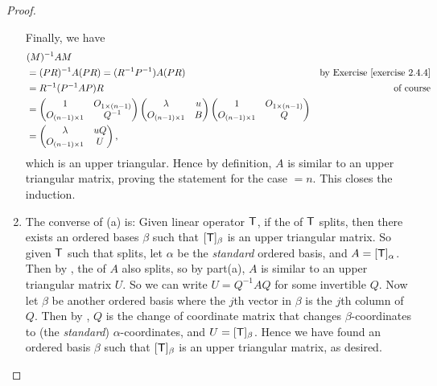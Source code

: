 \begin{proof}
\begin{enumerate}
Finally, we have
\begin{align*}
    & (M)^{-1} A M \\
    & = (PR)^{-1} A (PR) = (R^{-1} P^{-1}) A (P R) & \text{by \EXEC{2.4.4}} \\
    & = R^{-1} (P^{-1} A P) R & \text{of course} \\
    & = \begin{pmatrix}
        1 & O_{1 \X (n - 1)} \\
        O_{(n - 1) \X 1} & Q^{-1}
    \end{pmatrix}
    \begin{pmatrix}
        \lambda & u \\
        O_{(n - 1) \X 1} & B
    \end{pmatrix} \begin{pmatrix}
        1 & O_{1 \X (n - 1)} \\
        O_{(n - 1) \X 1} & Q
    \end{pmatrix} \\
    & = \begin{pmatrix}
        \lambda & uQ \\
        O_{(n - 1) \X 1} & U
    \end{pmatrix},
\end{align*}
which is an upper triangular.
Hence by definition, \(A\) is similar to an upper triangular matrix, proving the statement for the case \(= n\).
This closes the induction.

\item The converse of (a) is:
Given linear operator \(\textsf{T}\), if the \CPOLY{} of \(\textsf{T}\) splits, then there exists an ordered bases \(\beta\) such that \([\textsf{T}]_{\beta}\) is an upper triangular matrix.
So given \(\textsf{T}\) such that \CPOLY{} splits, let \(\alpha\) be the \emph{standard} ordered basis, and \(A = [\textsf{T}]_{\alpha}\).
Then by , the \CPOLY{} of \(A\) also splits, so by part(a), \(A\) is similar to an upper triangular matrix \(U\).
So we can write \(U = Q^{-1} A Q\) for some invertible \(Q\).
Now let \(\beta\) be another ordered basis where the \(j\)th vector in \(\beta\) is the \(j\)th column of \(Q\).
Then by , \(Q\) is the change of coordinate matrix that changes \(\beta\)-coordinates to (the \emph{standard}) \(\alpha\)-coordinates, and \(U = [\textsf{T}]_{\beta}\).
Hence we have found an ordered basis \(\beta\) such that \([\textsf{T}]_{\beta}\) is an upper triangular matrix, as desired.
\end{enumerate}
\end{proof}

